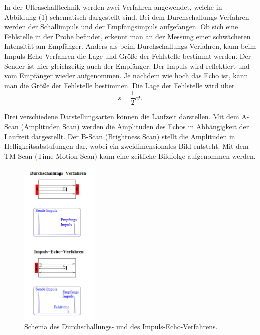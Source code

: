 In der Ultraschalltechnik werden zwei Verfahren angewendet, welche in Abbildung (1) schematisch dargestellt sind.
Bei dem Durchschallungs-Verfahren werden der Schallimpuls und der Empfangsimpuls aufgefangen. Ob sich eine Fehlstelle in der Probe befindet, erkennt man an der Messung einer schwächeren Intensität am Empfänger.
Anders als beim Durchschallungs-Verfahren, kann beim Impuls-Echo-Verfahren die Lage und Größe der Fehlstelle bestimmt werden. Der Sender ist hier gleichzeitig auch der Empfänger. Der Impuls wird reflektiert und vom Empfänger wieder aufgenommen.
Je nachdem wie hoch das Echo ist, kann man die Größe der Fehlstelle bestimmen.
Die Lage der Fehlstelle wird über
\begin{equation}
s = \frac{1}{2}ct .
\end{equation}

Drei verschiedene Darstellungsarten können die Laufzeit darstellen.
Mit dem A-Scan (Amplituden Scan) werden die Amplituden des Echos in Abhängigkeit der Laufzeit dargestellt.
Der B-Scan (Brightness Scan) stellt die Amplituden in Helligkeitsabstufungen dar, wobei ein zweidimensionales Bild entsteht.
Mit dem TM-Scan (Time-Motion Scan) kann eine zeitliche Bildfolge aufgenommen werden.

\begin{figure}[H]
  \centering
  \includegraphics[height=8cm]{verfahren.png}
  \caption{Schema des Durchschallungs- und des Impuls-Echo-Verfahrens. \cite[S.2]{kent}}
\end{figure}


